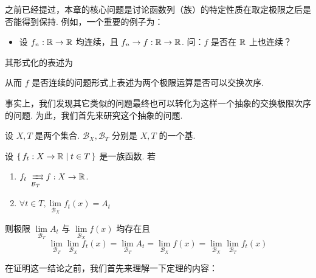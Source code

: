 
之前已经提过，本章的核心问题是讨论函数列（族）的特定性质在取定极限之后是否能得到保持. 例如，一个重要的例子为：

\begin{itemize}
    \item 设 $f_n:\mathbb{R}\to\mathbb{R}$ 均连续，且 $f_n\to f:\mathbb{R}\to\mathbb{R}$. 问：$f$ 是否在 $\mathbb{R}$ 上也连续？
\end{itemize}

其形式化的表述为

\begin{center}
\end{center}

从而 $f$ 是否连续的问题形式上表述为两个极限运算是否可以交换次序.

事实上，我们发现其它类似的问题最终也可以转化为这样一个抽象的交换极限次序的问题. 为此，我们首先来研究这个抽象的问题.


\begin{theorem}\label{sl}
    设 $X,T$ 是两个集合. $\mathcal{B}_X,\mathcal{B}_T$ 分别是 $X,T$ 的一个基.

    设 $\set{f_t:X\to\mathbb{R}|t\in T}$ 是一族函数. 若

    \begin{enumerate}
        \item\label{slcon1} $f_t\xrightrightarrows[\mathcal{B}_T]{}f:X\to\RR$.
        
        \item\label{slcon2} $\forall t\in T,\lim\limits_{\mathcal{B}_X}f_t(x)=A_t$
    \end{enumerate}

    则极限 $\lim\limits_{\mathcal{B}_T}A_t$ 与 $\lim\limits_{\mathcal{B}_X}f(x)$ 均存在且
$$
\lim_{\mathcal{B}_T}\lim_{\mathcal{B}_X}f_t(x)=\lim_{\mathcal{B}_T}A_t=\lim_{\mathcal{B}_X}f(x)=\lim_{\mathcal{B}_X}\lim_{\mathcal{B}_T}f_t(x)
$$
\end{theorem}

在证明这一结论之前，我们首先来理解一下定理的内容：

